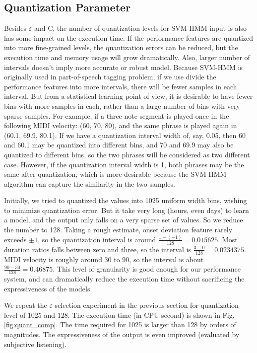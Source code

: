 \subsection{Quantization Parameter}
Besides $\varepsilon$ and C, the number of quantization levels for SVM-HMM input is also has some impact on the execution time. If the performance features are quantized into more fine-grained levels, the quantization errors can be reduced, but the execution time and memory usage will grow dramatically. Also, larger number of intervals doesn't imply more accurate or robust model. Because SVM-HMM is originally used in part-of-speech tagging problem, if we use divide the performance features into more intervals, there will be fewer samples in each interval. But from a statistical learning point of view, it is desirable to have fewer bins with more samples in each, rather than a large number of bins with very sparse samples. For example, if a three note segment is played once in the following MIDI velocity: (60, 70, 80), and the same phrase is played again in (60.1, 69.9, 80.1). If we have a quantization interval width of, say, 0.05, then 60 and 60.1 may be quantized into different bins, and 70 and 69.9 may also be quantized to different bins, so the two phrases will be considered as two different case. However, if the quantization interval width is 1, both phrases may be the same after quantization, which is more desirable because the SVM-HMM algorithm can capture the similarity in the two samples. 

Initially, we tried to quantized the values into 1025 uniform width bins, wishing to minimize quantization error. But it take very long (hours, even days) to learn a model, and the output only falls on a very sparse set of values. So we reduce the number to 128. Taking a rough estimate, onset deviation feature rarely exceeds $\pm 1$, so the quantization interval is around $\frac{1-(-1)}{128} = 0.015625$. Most duration ratios falls between zero and three, so the interval is $\frac{3-0}{128} = 0.0234375$. MIDI velocity is roughly around 30 to 90, so the interval is about $\frac{90-30}{128} = 0.46875$. This level of granularity is good enough for our performance system, and can dramatically reduce the execution time without sacrificing the expressiveness of the models. 

We repeat the $\varepsilon$ selection experiment in the previous section for quantization level of 1025 and 128. The execution time (in CPU second) is shown in Fig. \ref{fig:quant_comp}. The time required for 1025 is larger than 128 by orders of magnitudes. The expressiveness of the output is even improved (evaluated by subjective listening).

